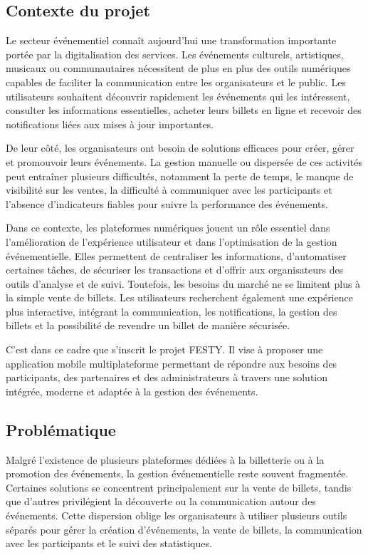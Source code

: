 \subsection{Contexte du projet}
Le secteur événementiel connaît aujourd’hui une transformation importante portée par la digitalisation des services. Les événements culturels, artistiques, musicaux ou communautaires nécessitent de plus en plus des outils numériques capables de faciliter la communication entre les organisateurs et le public. Les utilisateurs souhaitent découvrir rapidement les événements qui les intéressent, consulter les informations essentielles, acheter leurs billets en ligne et recevoir des notifications liées aux mises à jour importantes.

De leur côté, les organisateurs ont besoin de solutions efficaces pour créer, gérer et promouvoir leurs événements. La gestion manuelle ou dispersée de ces activités peut entraîner plusieurs difficultés, notamment la perte de temps, le manque de visibilité sur les ventes, la difficulté à communiquer avec les participants et l’absence d’indicateurs fiables pour suivre la performance des événements.

Dans ce contexte, les plateformes numériques jouent un rôle essentiel dans l'amélioration de l'expérience utilisateur et dans l'optimisation de la gestion événementielle. Elles permettent de centraliser les informations, d'automatiser certaines tâches, de sécuriser les transactions et d'offrir aux organisateurs des outils d'analyse et de suivi. Toutefois, les besoins du marché ne se limitent plus à la simple vente de billets. Les utilisateurs recherchent également une expérience plus interactive, intégrant la communication, les notifications, la gestion des billets et la possibilité de revendre un billet de manière sécurisée.

C'est dans ce cadre que s'inscrit le projet FESTY. Il vise à proposer une application mobile multiplateforme permettant de répondre aux besoins des participants, des partenaires et des administrateurs à travers une solution intégrée, moderne et adaptée à la gestion des événements.

\subsection{Problématique}
Malgré l'existence de plusieurs plateformes dédiées à la billetterie ou à la promotion des événements, la gestion événementielle reste souvent fragmentée. Certaines solutions se concentrent principalement sur la vente de billets, tandis que d'autres privilégient la découverte ou la communication autour des événements. Cette dispersion oblige les organisateurs à utiliser plusieurs outils séparés pour gérer la création d'événements, la vente de billets, la communication avec les participants et le suivi des statistiques.

